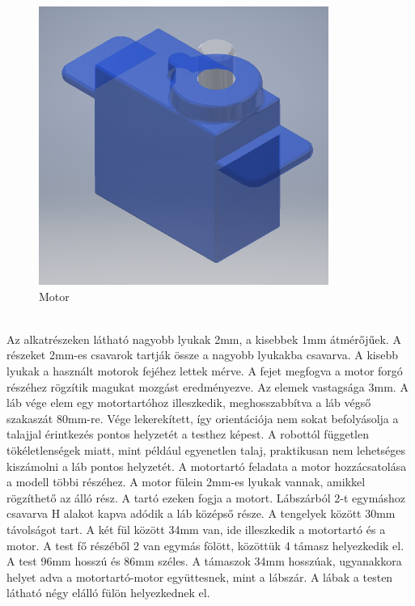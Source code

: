 \documentclass{article}
\begin{document}
\begin{figure}[h]
\begin{minipage}{0.3\textwidth}
	\includegraphics[width=\textwidth]{motor}
	\caption{Motor}
\end{minipage}
\end{figure}
\\
Az alkatrészeken látható nagyobb lyukak 2mm, a kisebbek 1mm átmérőjűek. A részeket 2mm-es csavarok tartják össze a nagyobb lyukakba csavarva. A kisebb lyukak a használt motorok fejéhez lettek mérve. A fejet megfogva a motor forgó részéhez rögzítik magukat mozgást eredményezve. Az elemek vastagsága 3mm.
A láb vége elem egy motortartóhoz illeszkedik, meghosszabbítva a láb végső szakaszát 80mm-re. Vége lekerekített, így orientációja nem sokat befolyásolja a talajjal érintkezés pontos helyzetét a testhez képest. A robottól független tökéletlenségek miatt, mint például egyenetlen talaj, praktikusan nem lehetséges kiszámolni a láb pontos helyzetét. 
A motortartó feladata a motor hozzácsatolása a modell többi részéhez. A motor fülein 2mm-es lyukak vannak, amikkel rögzíthető az álló rész. A tartó ezeken fogja a motort.
Lábszárból 2-t egymáshoz csavarva H alakot kapva adódik a láb középső része. A tengelyek között 30mm távolságot tart. A két fül között 34mm van, ide illeszkedik a motortartó és a motor.
A test fő részéből 2 van egymás fölött, közöttük 4 támasz helyezkedik el. A test 96mm hosszú és 86mm széles. A támaszok 34mm hosszúak, ugyanakkora helyet adva a motortartó-motor együttesnek, mint a lábszár. A lábak a testen látható négy elálló fülön helyezkednek el.
\end{document}
